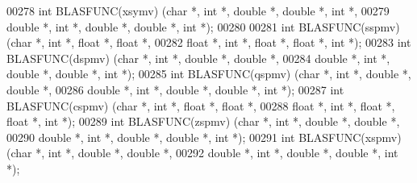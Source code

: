 \begin{DoxyCode}
00278 \textcolor{keywordtype}{int} BLASFUNC(xsymv) (\textcolor{keywordtype}{char} *, \textcolor{keywordtype}{int} *, \textcolor{keywordtype}{double}  *, \textcolor{keywordtype}{double} *, \textcolor{keywordtype}{int} *,
00279              \textcolor{keywordtype}{double}  *, \textcolor{keywordtype}{int} *, \textcolor{keywordtype}{double} *, \textcolor{keywordtype}{double} *, \textcolor{keywordtype}{int} *);
00280 
00281 \textcolor{keywordtype}{int} BLASFUNC(sspmv) (\textcolor{keywordtype}{char} *, \textcolor{keywordtype}{int} *, \textcolor{keywordtype}{float}  *, \textcolor{keywordtype}{float} *,
00282              \textcolor{keywordtype}{float}  *, \textcolor{keywordtype}{int} *, \textcolor{keywordtype}{float} *, \textcolor{keywordtype}{float} *, \textcolor{keywordtype}{int} *);
00283 \textcolor{keywordtype}{int} BLASFUNC(dspmv) (\textcolor{keywordtype}{char} *, \textcolor{keywordtype}{int} *, \textcolor{keywordtype}{double}  *, \textcolor{keywordtype}{double} *,
00284              \textcolor{keywordtype}{double}  *, \textcolor{keywordtype}{int} *, \textcolor{keywordtype}{double} *, \textcolor{keywordtype}{double} *, \textcolor{keywordtype}{int} *);
00285 \textcolor{keywordtype}{int} BLASFUNC(qspmv) (\textcolor{keywordtype}{char} *, \textcolor{keywordtype}{int} *, \textcolor{keywordtype}{double}  *, \textcolor{keywordtype}{double} *,
00286              \textcolor{keywordtype}{double}  *, \textcolor{keywordtype}{int} *, \textcolor{keywordtype}{double} *, \textcolor{keywordtype}{double} *, \textcolor{keywordtype}{int} *);
00287 \textcolor{keywordtype}{int} BLASFUNC(cspmv) (\textcolor{keywordtype}{char} *, \textcolor{keywordtype}{int} *, \textcolor{keywordtype}{float}  *, \textcolor{keywordtype}{float} *,
00288              \textcolor{keywordtype}{float}  *, \textcolor{keywordtype}{int} *, \textcolor{keywordtype}{float} *, \textcolor{keywordtype}{float} *, \textcolor{keywordtype}{int} *);
00289 \textcolor{keywordtype}{int} BLASFUNC(zspmv) (\textcolor{keywordtype}{char} *, \textcolor{keywordtype}{int} *, \textcolor{keywordtype}{double}  *, \textcolor{keywordtype}{double} *,
00290              \textcolor{keywordtype}{double}  *, \textcolor{keywordtype}{int} *, \textcolor{keywordtype}{double} *, \textcolor{keywordtype}{double} *, \textcolor{keywordtype}{int} *);
00291 \textcolor{keywordtype}{int} BLASFUNC(xspmv) (\textcolor{keywordtype}{char} *, \textcolor{keywordtype}{int} *, \textcolor{keywordtype}{double}  *, \textcolor{keywordtype}{double} *,
00292              \textcolor{keywordtype}{double}  *, \textcolor{keywordtype}{int} *, \textcolor{keywordtype}{double} *, \textcolor{keywordtype}{double} *, \textcolor{keywordtype}{int} *);

\end{DoxyCode}
